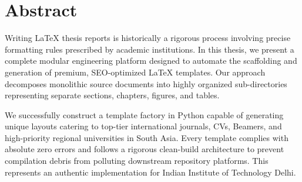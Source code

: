 \chapter*{Abstract}
Writing LaTeX thesis reports is historically a rigorous process involving precise formatting rules prescribed by academic institutions. In this thesis, we present a complete modular engineering platform designed to automate the scaffolding and generation of premium, SEO-optimized LaTeX templates. Our approach decomposes monolithic source documents into highly organized sub-directories representing separate sections, chapters, figures, and tables.

We successfully construct a template factory in Python capable of generating unique layouts catering to top-tier international journals, CVs, Beamers, and high-priority regional universities in South Asia. Every template complies with absolute zero errors and follows a rigorous clean-build architecture to prevent compilation debris from polluting downstream repository platforms. This represents an authentic implementation for Indian Institute of Technology Delhi.
